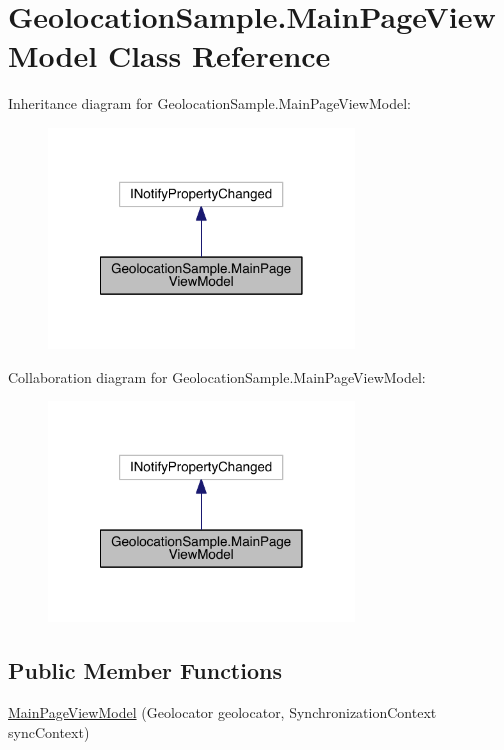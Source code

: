 \hypertarget{class_geolocation_sample_1_1_main_page_view_model}{\section{Geolocation\+Sample.\+Main\+Page\+View\+Model Class Reference}
\label{class_geolocation_sample_1_1_main_page_view_model}
}


Inheritance diagram for Geolocation\+Sample.\+Main\+Page\+View\+Model\+:
\nopagebreak
\begin{figure}[H]
\begin{center}
\leavevmode
\includegraphics[width=230pt]{class_geolocation_sample_1_1_main_page_view_model__inherit__graph}
\end{center}
\end{figure}


Collaboration diagram for Geolocation\+Sample.\+Main\+Page\+View\+Model\+:
\nopagebreak
\begin{figure}[H]
\begin{center}
\leavevmode
\includegraphics[width=230pt]{class_geolocation_sample_1_1_main_page_view_model__coll__graph}
\end{center}
\end{figure}
\subsection*{Public Member Functions}
\begin{DoxyCompactItemize}
\item 
\hyperlink{class_geolocation_sample_1_1_main_page_view_model_a2418182978b24e063f7590871473f196}{Main\+Page\+View\+Model} (Geolocator geolocator, Synchronization\+Context sync\+Context)
\end{DoxyCompactItemize}
